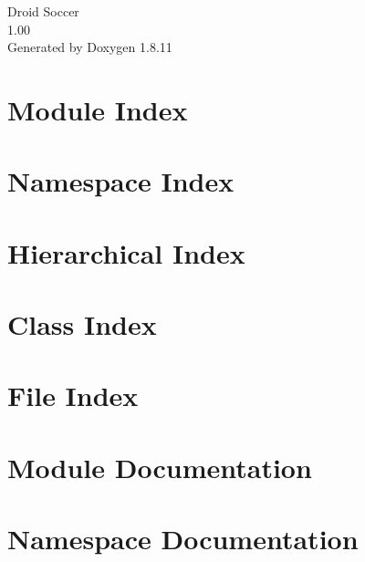 \documentclass[twoside]{book}
\newcommand{\+}{\discretionary{\mbox{\scriptsize$\hookleftarrow$}}{}{}}
\newcommand{\clearemptydoublepage}{%
  \newpage{\pagestyle{empty}\cleardoublepage}%
}
\begin{document}
\hypersetup{pageanchor=false,
             bookmarksnumbered=true,
             pdfencoding=unicode
            }
\begin{titlepage}
\vspace*{7cm}
\begin{center}%
{\Large Droid Soccer \\[1ex]\large 1.\+00 }\\
\vspace*{1cm}
{\large Generated by Doxygen 1.8.11}\\
\end{center}
\end{titlepage}
\clearemptydoublepage
\tableofcontents
\clearemptydoublepage
{}
\hypersetup{pageanchor=true}

\chapter{Module Index}

\chapter{Namespace Index}

\chapter{Hierarchical Index}

\chapter{Class Index}

\chapter{File Index}

\chapter{Module Documentation}


\chapter{Namespace Documentation}














\end{document}

